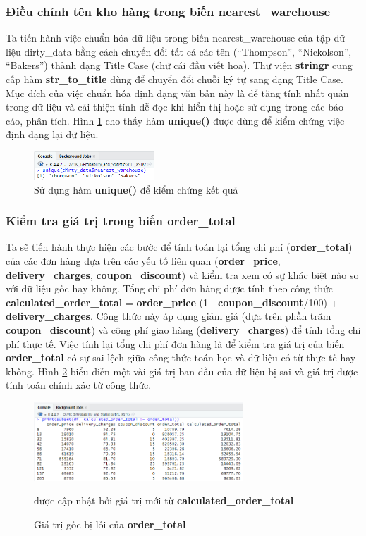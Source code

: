 \subsubsection{Điều chỉnh tên kho hàng trong biến nearest\_warehouse}

Ta tiến hành việc chuẩn hóa dữ liệu trong biến nearest\_warehouse của tập dữ liệu dirty\_data bằng cách chuyển đổi tất cả các tên (``Thompson'', ``Nickolson'',  ``Bakers'') thành dạng Title Case (chữ cái đầu viết hoa). Thư viện \textbf{stringr} cung cấp hàm \textbf{str\_to\_title} dùng để chuyển đổi chuỗi ký tự sang dạng Title Case. Mục đích của việc chuẩn hóa định dạng văn bản này là để tăng tính nhất quán trong dữ liệu và cải thiện tính dễ đọc khi hiển thị hoặc sử dụng trong các báo cáo, phân tích. Hình \ref{f4} cho thấy hàm \textbf{unique()} được dùng để kiểm chứng việc định dạng lại dữ liệu.
\begin{figure}[!htbp]
    \centering
    \includegraphics[width=0.4\textwidth]{graphics/Pre_processing_data/f4.PNG}
    \caption{Sử dụng hàm \textbf{unique()} để kiểm chứng kết quả}
    \label{f4}
\end{figure}

\subsubsection{Kiểm tra giá trị trong biến order\_total}
Ta sẽ tiến hành thực hiện các bước để tính toán lại tổng chi phí (\textbf{order\_total}) của các đơn hàng dựa trên các yếu tố liên quan (\textbf{order\_price}, \textbf{delivery\_charges}, \textbf{coupon\_discount}) và kiểm tra xem có sự khác biệt nào so với dữ liệu gốc hay không. Tổng chi phí đơn hàng được tính theo công thức \textbf{calculated\_order\_total} = \textbf{order\_price} \times (1 - \textbf{coupon\_discount}/100) + \textbf{delivery\_charges}. Công thức này áp dụng giảm giá (dựa trên phần trăm \textbf{coupon\_discount}) và cộng phí giao hàng (\textbf{delivery\_charges}) để tính tổng chi phí thực tế. Việc tính lại tổng chi phí đơn hàng là để kiểm tra giá trị của biến \textbf{order\_total} có sự sai lệch giữa công thức toán học và dữ liệu có từ thực tế hay không. Hình \ref{f5} biểu diễn một vài giá trị ban đầu của dữ liệu bị sai và giá trị được tính toán chính xác từ công thức.
\begin{figure}[!htbp]
    \centering
    \includegraphics[width=0.7\textwidth]{graphics/Pre_processing_data/f5.PNG}
    \caption{Giá trị gốc bị lỗi của \textbf{order\_total}} được cập nhật bởi giá trị mới từ \textbf{calculated\_order\_total} 
    \label{f5}
\end{figure}

